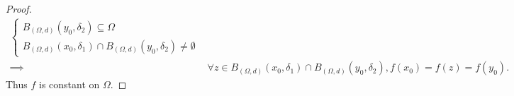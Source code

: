 \begin{proof}
\begin{align*}
\begin{cases}
                                                                                           B_{(\Omega, d)}(y_0, \delta_2) \subseteq \Omega \\
                                                                                           B_{(\Omega, d)}(x_0, \delta_1) \cap B_{(\Omega, d)}(y_0, \delta_2) \neq \emptyset
                                                                                       \end{cases} \\
        \implies & \forall z \in B_{(\Omega, d)}(x_0, \delta_1) \cap B_{(\Omega, d)}(y_0, \delta_2), f(x_0) = f(z) = f(y_0).
    \end{align*}
    Thus \(f\) is constant on \(\Omega\).
\end{proof}